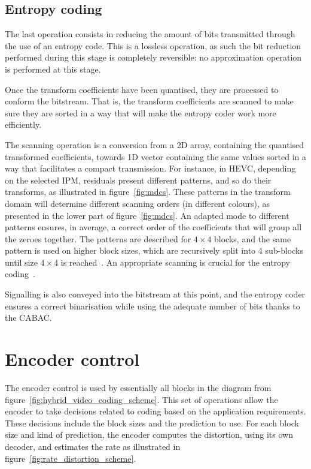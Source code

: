 \documentclass[11pt,a4paper,openright,twoside]{book}
\numberwithin{equation}{section} %
\numberwithin{figure}{section} %
\numberwithin{table}{section} %
\begin{document}
\subsection{Entropy coding}
\label{sub:entropy_coding}

The last operation consists in reducing the amount of bits transmitted through
the use of an entropy code.
This is a lossless operation, as such the bit reduction performed during this
stage is completely reversible: no approximation operation is performed at
this stage.

Once the transform coefficients have been quantised, they are processed to
conform the bitstream.
That is, the transform coefficients are scanned to make sure they are
sorted in a way that will make the entropy coder work more efficiently.

The scanning operation is a conversion from a 2D array, containing the
quantised transformed coefficients, towards 1D vector containing the same
values sorted in a way that facilitates a compact transmission.
For instance, in \ac{HEVC}, depending on the selected \ac{IPM}, residuals
present different patterns, and so do their transforms, as illustrated in
figure~\ref{fig:mdcs}.
These patterns in the transform domain will determine different scanning
orders (in different colours), as presented in the lower part of
figure~\ref{fig:mdcs}.
An adapted mode to different patterns ensures, in average, a correct order of
the coefficients that will group all the zeroes
together.
The patterns are described for $4\times4$ blocks, and the same pattern is used
on higher block sizes, which are recursively split into 4 sub-blocks until
size $4\times4$ is reached~\cite{sole-12-transform-coefficient-coding}.
An appropriate scanning is crucial for the entropy
coding~\cite{ye-08-intra-directional-scanning-mddt}.

Signalling is also conveyed into the bitstream at this point, and the
entropy coder ensures a correct binarisation while using the adequate
number of bits thanks to the \ac{CABAC}.

\section{Encoder control}
\label{sec:encoder_control}

The encoder control is used by essentially all blocks in the diagram
from figure~\ref{fig:hybrid_video_coding_scheme}.
This set of operations allow the encoder to take decisions related to coding
based on the application requirements.
These decisions include the block sizes and the prediction to use.
For each block size and kind of prediction, the encoder computes the
distortion, using its own decoder, and estimates the rate as illustrated in
figure~\ref{fig:rate_distortion_scheme}.
\end{document}
